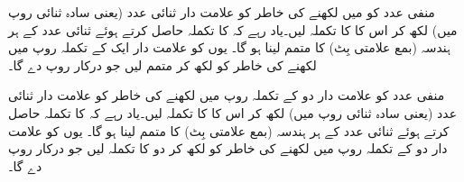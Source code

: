 منفی عدد  کو میں لکھنے کی خاطر  کو علامت دار ثنائی عدد (یعنی سادہ ثنائی روپ میں) لکھ کر اس کا  کا تکملہ لیں۔یاد رہے کہ  کا تکملہ حاصل کرتے ہوئے ثنائی عدد کے ہر ہندسہ (بمع علامتی بِٹ) کا متمم لینا ہو گا۔ یوں  کو علامت دار ایک کے تکملہ روپ میں لکھنے کی خاطر  کو  لکھ کر متمم لیں جو درکار روپ  دے گا۔

منفی عدد  کو علامت دار دو کے تکملہ روپ میں لکھنے کی خاطر  کو علامت دار ثنائی عدد (یعنی سادہ ثنائی روپ میں) لکھ کر اس کا  کا تکملہ لیں۔یاد رہے کہ  کا تکملہ حاصل کرتے ہوئے ثنائی عدد کے ہر ہندسہ (بمع علامتی بِٹ) کا متمم لینا ہو گا۔ یوں  کو علامت دار دو کے تکملہ روپ میں لکھنے کی خاطر  کو  لکھ کر دو کا تکملہ لیں جو درکار روپ  دے گا۔

